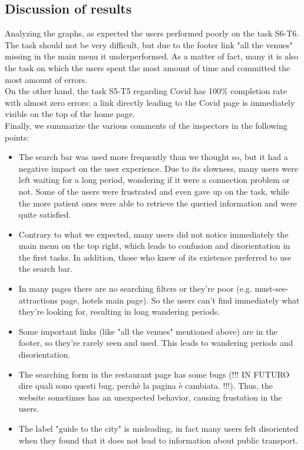 \subsection{Discussion of results}
    Analyzing the graphs, as expected the users performed poorly on the task S6-T6. The task should not be very difficult, but due to the footer link "all the venues" missing in the main menu it underperformed. As a matter of fact, many it is also the task on which the users spent the most amount of time and committed the most amount of errors.\\
    On the other hand, the task S5-T5 regarding Covid has 100\% completion rate with almost zero errors: a link directly leading to the Covid page is immediately visible on the top of the home page.\\
    Finally, we summarize the various comments of the inspectors in the following points:
    \begin{itemize}
        \item The search bar was used more frequently than we thought so, but it had a negative impact on the user experience. Due to its slowness, many users were left waiting for a long period, wondering if it were a connection problem or not. Some of the users were frustrated and even gave up on the task, while the more patient ones were able to retrieve the queried information and were quite satisfied.
        \item Contrary to what we expected, many users did not notice immediately the main menu on the top right, which leads to confusion and disorientation in the first tasks. In addition, those who knew of its existence preferred to use the search bar.
        \item In many pages there are no searching filters or they're poor (e.g. must-see-attractions page, hotels main page). So the users can't find immediately what they're looking for, resulting in long wandering periods.
        \item Some important links (like "all the venues" mentioned above) are in the footer, so they're rarely seen and used. This leads to wandering periods and disorientation.
        \item The searching form in the restaurant page has some bugs (!!! IN FUTURO dire quali sono questi bug, perchè la pagina è cambiata. !!!). Thus, the website sometimes has an unexpected behavior, causing frustation in the users.
        \item The label "guide to the city" is misleading, in fact many users felt disoriented when they found that it does not lead to information about public transport.
    \end{itemize}
